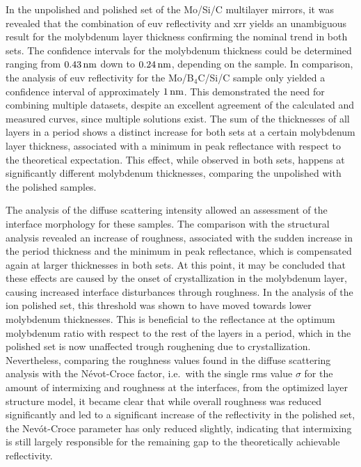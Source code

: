 In the unpolished and polished set of the Mo/Si/C multilayer mirrors, it was revealed that the combination of \gls{euv} reflectivity and \gls{xrr} yields an unambiguous result for the molybdenum layer thickness confirming the nominal trend in both sets. The confidence intervals for the molybdenum thickness could be determined ranging from $\nm{0.43}$ down to $\nm{0.24}$, depending on the sample. In comparison, the analysis of \gls{euv} reflectivity for the Mo/B$_4$C/Si/C sample only yielded a confidence interval of approximately $\nm{1}$. This demonstrated the need for combining multiple datasets, despite an excellent agreement of the calculated and measured curves, since multiple solutions exist.
The sum of the thicknesses of all layers in a period shows a distinct increase for both sets at a certain molybdenum layer thickness, associated with a minimum in peak reflectance with respect to the theoretical expectation. This effect, while observed in both sets, happens at significantly different molybdenum thicknesses, comparing the unpolished with the polished samples.

The analysis of the diffuse scattering intensity allowed an assessment of the interface morphology for these samples. The comparison with the structural analysis revealed an increase of roughness, associated with the sudden increase in the period thickness and the minimum in peak reflectance, which is compensated again at larger thicknesses in both sets. At this point, it may be concluded that these effects are caused by the onset of crystallization in the molybdenum layer, causing increased interface disturbances through roughness. In the analysis of the ion polished set, this threshold was shown to have moved towards lower molybdenum thicknesses. This is beneficial to the reflectance at the optimum molybdenum ratio with respect to the rest of the layers in a period, which in the polished set is now unaffected trough roughening due to crystallization. Nevertheless, comparing the roughness values found in the diffuse scattering analysis with the N{\'e}vot-Croce factor, i.e.~with the single \gls{rms} value $\sigma$ for the amount of intermixing and roughness at the interfaces, from the optimized layer structure model, it became clear that while overall roughness was reduced significantly and led to a significant increase of the reflectivity in the polished set, the Nev{\'o}t-Croce parameter has only reduced slightly, indicating that intermixing is still largely responsible for the remaining gap to the theoretically achievable reflectivity.

